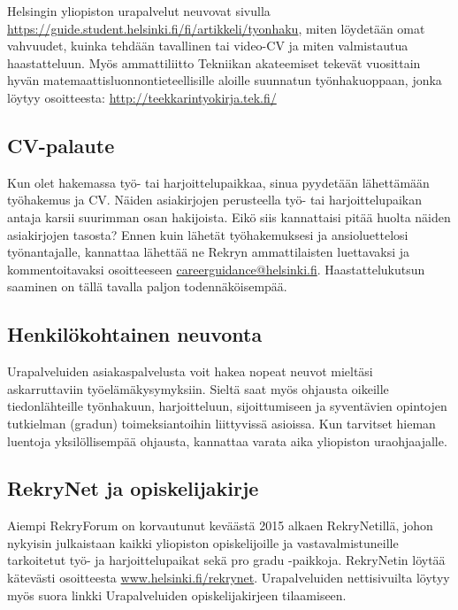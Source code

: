 \documentclass[a5paper, 8pt, twocolumn]{book} %
\numberwithin{equation}{section}
\begin{document}
Helsingin yliopiston urapalvelut neuvovat sivulla \url{https://guide.student.helsinki.fi/fi/artikkeli/tyonhaku}, miten löydetään omat vahvuudet, kuinka tehdään tavallinen tai video-CV ja miten valmistautua haastatteluun. Myös ammattiliitto Tekniikan akateemiset tekevät vuosittain hyvän matemaattisluonnontieteellisille aloille suunnatun työnhakuoppaan, jonka löytyy osoitteesta: \url{http://teekkarintyokirja.tek.fi/}

\subsection*{CV-palaute}
Kun olet hakemassa työ- tai harjoittelupaikkaa,
sinua pyydetään lähettämään
työhakemus ja CV. Näiden asiakirjojen
perusteella työ- tai harjoittelupaikan antaja
karsii suurimman osan hakijoista. Eikö siis
kannattaisi pitää huolta näiden asiakirjojen
tasosta? Ennen kuin lähetät työhakemuksesi
ja ansioluettelosi työnantajalle, kannattaa
lähettää ne Rekryn ammattilaisten luettavaksi
ja kommentoitavaksi osoitteeseen
\url{careerguidance@helsinki.fi}. Haastattelukutsun
saaminen on tällä tavalla paljon todennäköisempää.

\subsection*{Henkilökohtainen neuvonta}
Urapalveluiden asiakaspalvelusta voit hakea
nopeat neuvot mieltäsi askarruttaviin
työelämäkysymyksiin.
Sieltä saat myös ohjausta
oikeille tiedonlähteille työnhakuun,
harjoitteluun, sijoittumiseen ja syventävien opintojen tutkielman (gradun)
toimeksiantoihin
liittyvissä asioissa. Kun
tarvitset hieman luentoja yksilöllisempää ohjausta, kannattaa varata aika yliopiston uraohjaajalle.

\subsection*{RekryNet ja opiskelijakirje}
Aiempi RekryForum on korvautunut
keväästä 2015 alkaen RekryNetillä, johon
nykyisin julkaistaan kaikki yliopiston opiskelijoille
ja vastavalmistuneille tarkoitetut
työ- ja harjoittelupaikat sekä pro gradu
-paikkoja. RekryNetin löytää kätevästi
osoitteesta \url{www.helsinki.fi/rekrynet}.
Urapalveluiden nettisivuilta löytyy
myös suora linkki Urapalveluiden opiskelijakirjeen
tilaamiseen.

\onecolumn
\end{document}
